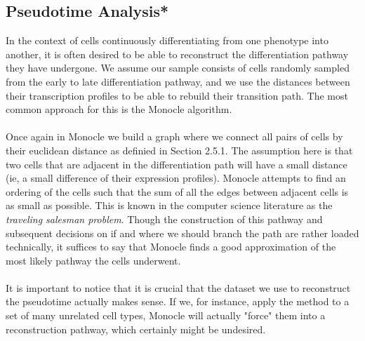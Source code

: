 \newpage
\subsection{Pseudotime Analysis*}
In the context of cells continuously differentiating from one phenotype into another, it is often desired to be able to reconstruct the differentiation pathway they have undergone. We assume our sample consists of cells randomly sampled from the early to late differentiation pathway, and we use the distances between their transcription profiles to be able to rebuild their transition path. The most common approach for this is the Monocle \cite{trapnell2014dynamics} algorithm. \\
\\
Once again in Monocle we build a graph where we connect all pairs of cells by their euclidean distance as definied in Section 2.5.1. The assumption here is that two cells that are adjacent in the differentiation path will have a small distance (ie, a small difference of their expression profiles). Monocle attempts to find an ordering of the cells such that the sum of all the edges between adjacent cells is as small as possible. This is known in the computer science literature as the \emph{traveling salesman problem}. Though the construction of this pathway and subsequent decisions on if and where we should branch the path are rather loaded technically, it suffices to say that Monocle finds a good approximation of the most likely pathway the cells underwent.\\
\\
It is important to notice that it is crucial that the dataset we use to reconstruct the pseudotime actually makes sense. If we, for instance, apply the method to a set of many unrelated cell types, Monocle will actually "force" them into a reconstruction pathway, which certainly might be undesired. 
\newpage




